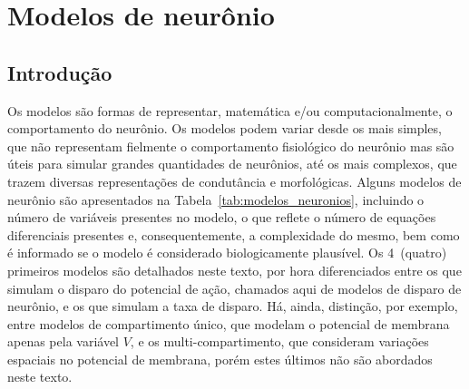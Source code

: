 \chapter{Modelos de neurônio}\label{cap:modelos}
\section{Introdução}\label{sec:modelos_intro}
Os modelos são formas de representar, matemática e/ou computacionalmente, o comportamento do neurônio. Os modelos podem variar desde os mais simples, que não representam fielmente o comportamento fisiológico do neurônio mas são úteis para simular grandes quantidades de neurônios, até os mais complexos, que trazem diversas representações de condutância e morfológicas. Alguns modelos de neurônio são apresentados na Tabela~\ref{tab:modelos_neuronios}, incluindo o número de variáveis presentes no modelo, o que reflete o número de equações diferenciais presentes e, consequentemente, a complexidade do mesmo, bem como é informado se o modelo é considerado biologicamente plausível. Os 4~(quatro) primeiros modelos são detalhados neste texto, por hora diferenciados entre os que simulam o disparo do potencial de ação, chamados aqui de modelos de disparo de neurônio, e os que simulam a taxa de disparo. Há, ainda, distinção, por exemplo, entre modelos de compartimento único, que modelam o potencial de membrana apenas pela variável $V$, e os multi-compartimento, que consideram variações espaciais no potencial de membrana, porém estes últimos não são abordados neste texto.

\begin{table}
\end{table}

